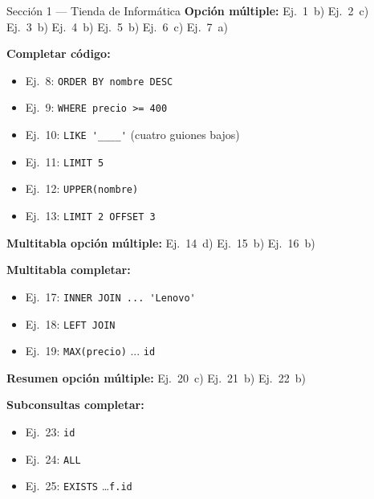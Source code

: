 \documentclass[12pt, a4paper]{article}
\begin{document}
\begin{solucionbox}{Sección 1 — Tienda de Informática}
\textbf{Opción múltiple:}
Ej.~1~b) \quad Ej.~2~c) \quad Ej.~3~b) \quad Ej.~4~b) \quad
Ej.~5~b) \quad Ej.~6~c) \quad Ej.~7~a)

\medskip
\textbf{Completar código:}
\begin{itemize}[leftmargin=1em, itemsep=3pt]
  \item Ej.~8: \lstinline|ORDER BY nombre DESC|
  \item Ej.~9: \lstinline|WHERE precio >= 400|
  \item Ej.~10: \lstinline|LIKE '____'| (cuatro guiones bajos)
  \item Ej.~11: \lstinline|LIMIT 5|
  \item Ej.~12: \lstinline|UPPER(nombre)|
  \item Ej.~13: \lstinline|LIMIT 2 OFFSET 3|
\end{itemize}

\medskip
\textbf{Multitabla opción múltiple:}
Ej.~14~d) \quad Ej.~15~b) \quad Ej.~16~b)

\medskip
\textbf{Multitabla completar:}
\begin{itemize}[leftmargin=1em, itemsep=3pt]
  \item Ej.~17: \lstinline|INNER JOIN ... 'Lenovo'|
  \item Ej.~18: \lstinline|LEFT JOIN|
  \item Ej.~19: \lstinline|MAX(precio)| ... \lstinline|id|
\end{itemize}

\medskip
\textbf{Resumen opción múltiple:}
Ej.~20~c) \quad Ej.~21~b) \quad Ej.~22~b)

\medskip
\textbf{Subconsultas completar:}
\begin{itemize}[leftmargin=1em, itemsep=3pt]
  \item Ej.~23: \lstinline|id|
  \item Ej.~24: \lstinline|ALL|
  \item Ej.~25: \lstinline|EXISTS| \ldots \lstinline|f.id|
\end{itemize}
\end{solucionbox}
\end{document}
